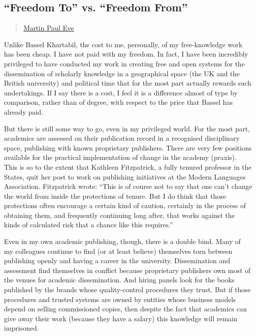 \subsection{\texorpdfstring{``Freedom To'' vs. ``Freedom
From''}{Freedom To vs. Freedom From}}\label{freedom-to-vs.-freedom-from}

\begin{quote}
\hyperlink{martin-paul-eve}{Martin Paul Eve}
\end{quote}

Unlike Bassel Khartabil, the cost to me, personally, of my
free-knowledge work has been cheap. I have not paid with my freedom. In
fact, I have been incredibly privileged to have conducted my work in
creating free and open systems for the dissemination of scholarly
knowledge in a geographical space (the UK and the British university)
and political time that for the most part actually rewards such
undertakings. If I say there is a cost, I feel it is a difference almost
of type by comparison, rather than of degree, with respect to the price
that Bassel has already paid.

But there is still some way to go, even in my privileged world. For the
most part, academics are assessed on their publication record in a
recognised disciplinary space, publishing with known proprietary
publishers. There are very few positions available for the practical
implementation of change in the academy (praxis). This is so to the
extent that Kathleen Fitzpatrick, a fully tenured professor in the
States, quit her post to work on publishing initiatives at the Modern
Languages Association. Fitzpatrick wrote: ``This is of course not to say
that one can't change the world from inside the protections of tenure.
But I do think that those protections often encourage a certain kind of
caution, certainly in the process of obtaining them, and frequently
continuing long after, that works against the kinds of calculated risk
that a chance like this requires.''

Even in my own academic publishing, though, there is a double bind. Many
of my colleagues continue to find (or at least believe) themselves torn
between publishing openly and having a career in the university.
Dissemination and assessment find themselves in conflict because
proprietary publishers own most of the venues for academic
dissemination. And hiring panels look for the books published by the
brands whose quality-control procedures they trust. But if those
procedures and trusted systems are owned by entities whose business
models depend on selling commissioned copies, then despite the fact that
academics can give away their work (because they have a salary) this
knowledge will remain imprisoned.

